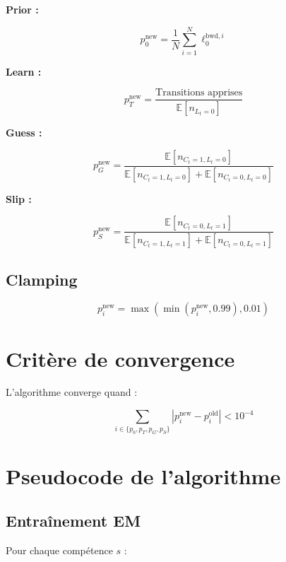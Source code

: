 \documentclass[12pt]{article}
\begin{document}
\textbf{Prior :}

$$p_0^{\text{new}} = \frac{1}{N} \sum_{i=1}^{N} \ell_0^{\text{bwd}, i}$$

\textbf{Learn :}

$$p_T^{\text{new}} = \frac{\text{Transitions apprises}}{\mathbb{E}[n_{L_t=0}]}$$

\textbf{Guess :}

$$p_G^{\text{new}} = \frac{\mathbb{E}[n_{C_t=1, L_t=0}]}{\mathbb{E}[n_{C_t=1, L_t=0}] + \mathbb{E}[n_{C_t=0, L_t=0}]}$$

\textbf{Slip :}

$$p_S^{\text{new}} = \frac{\mathbb{E}[n_{C_t=0, L_t=1}]}{\mathbb{E}[n_{C_t=1, L_t=1}] + \mathbb{E}[n_{C_t=0, L_t=1}]}$$

\subsection{Clamping}

$$p_i^{\text{new}} = \max(\min(p_i^{\text{new}}, 0.99), 0.01)$$

\section{Critère de convergence}

L'algorithme converge quand :

$$\sum_{i \in \{p_0, p_T, p_G, p_S\}} |p_i^{\text{new}} - p_i^{\text{old}}| < 10^{-4}$$

\newpage

\section{Pseudocode de l'algorithme}

\subsection{Entraînement EM}

Pour chaque compétence $s$ :
\end{document}
